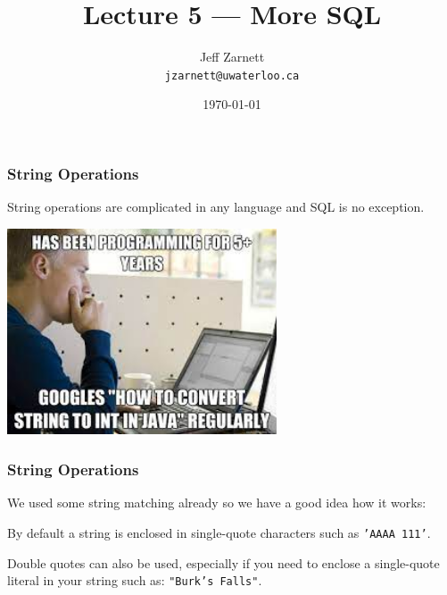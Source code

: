 

\title{Lecture 5 --- More SQL }

\author{Jeff Zarnett \\ \small \texttt{jzarnett@uwaterloo.ca}}
\date{\today}




\begin{frame}
  \titlepage

 \end{frame}



\begin{frame}
\frametitle{String Operations}

String operations are complicated in any language and SQL is no exception. 

\begin{center}
	\includegraphics[width=0.6\textwidth]{images/strings.jpg}
\end{center}

 \end{frame}



\begin{frame}
\frametitle{String Operations}


We used some string matching already so we have a good idea how it works: 

By default a string is enclosed in single-quote characters such as \texttt{'AAAA 111'}. 

Double quotes can also be used, especially if you need to enclose a single-quote literal in your string such as: \texttt{"Burk's Falls"}.

\end{frame}



